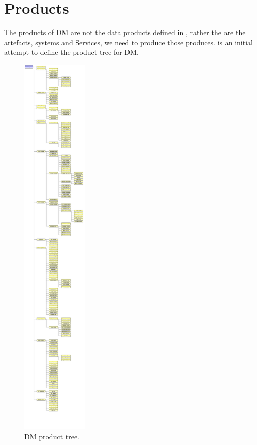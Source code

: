 \section {Products} \label{sect:products}

The products of DM are not the data products defined in , rather the are the artefacts, systems and Services,  we need to produce those produces.  is an initial attempt to define the product tree for DM. 

\begin{figure}[htbp]
\begin{center}
 \includegraphics[height=19cm]{ProductTree}
\caption{DM product tree. \label{fig:prods}}
\end{center}
\end{figure}

